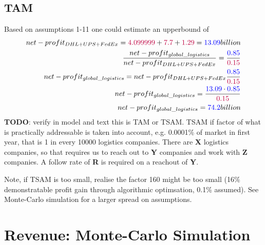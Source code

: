 \subsection{TAM}
Based on assumptions 1-11 one could estimate an upperbound of
\begin{equation}
	\begin{split}
		net-profit_{DHL+UPS+FedEx}=\textcolor{purple}{4.099999}+\textcolor{purple}{7.7}+\textcolor{purple}{1.29}=\textcolor{blue}{13.09} billion\\
		\frac{net-profit_{global\_logistics}}{net-profit_{DHL+UPS+FedEx}}=\frac{\textcolor{blue}{0.85}}{\textcolor{purple}{0.15}}\\
		net-profit_{global\_logistics}=net-profit_{DHL+UPS+FedEx}\frac{\textcolor{blue}{0.85}}{\textcolor{purple}{0.15}}\\
		net-profit_{global\_logistics}=\frac{\textcolor{blue}{13.09}\cdot\textcolor{blue}{0.85}}{\textcolor{purple}{0.15}}\\
		net-profit_{global\_logistics}=\textcolor{blue}{74.2} billion
	\end{split}
\end{equation}
\textbf{TODO}: verify in model and text this is TAM or TSAM. TSAM if factor of what is practically addressable is taken into account, e.g. 0.0001\% of market in first year, that is 1 in every 10000 logistics companies. There are \textbf{X} logistics companies, so that requires us to reach out to \textbf{Y} companies and work with \textbf{Z} companies. A follow rate of \textbf{R} is required on a reachout of \textbf{Y}.

Note, if TSAM is too small, realise the factor 160 might be too small (16\% demonstratable profit gain through algorithmic optimsation, 0.1\% assumed). See Monte-Carlo simulation for a larger spread on assumptions.

\section{Revenue: Monte-Carlo Simulation}\label{sec:results}

